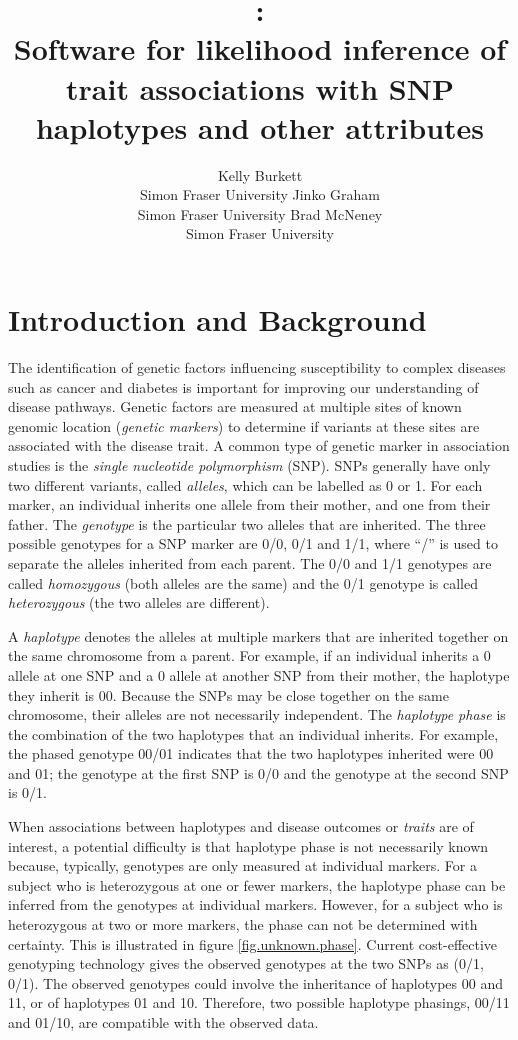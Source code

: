 \documentclass[article, shortnames]{jss}
\author{Kelly Burkett\\Simon Fraser University \And
        Jinko Graham\\Simon Fraser University \And 
	Brad McNeney\\Simon Fraser University  
	}
\title{\pkg{hapassoc}:\\ Software for likelihood inference of trait associations with SNP haplotypes and other attributes}
\begin{document}
\section{Introduction and Background}


The identification of genetic factors influencing susceptibility to
complex diseases such as cancer and diabetes is important for improving
our understanding of disease pathways. Genetic factors are measured at
multiple sites of known genomic location (\emph{genetic markers}) 
to determine if variants at these sites
are associated with the disease trait.
A common type of genetic marker in association studies is the
\emph{single nucleotide polymorphism} (SNP). SNPs
generally have only two different variants, called
\emph{alleles}, which can be labelled as 0 or 1. For each marker, an
individual inherits one allele from their mother, and one from their
father. The \emph{genotype} is the particular two alleles that are
inherited. The three possible genotypes for a SNP marker are 0/0, 0/1 and 1/1, 
where ``/'' is used to separate the alleles inherited from each parent. 
The 0/0 and 1/1 genotypes are called \emph{homozygous} (both alleles are the same)
and the 0/1 genotype is called \emph{heterozygous} (the two alleles are different).

A \emph{haplotype} denotes the alleles at multiple
markers that are inherited together on the same chromosome from a parent.  
For example, if an individual inherits a 0 allele at 
one SNP and a 0 allele at another SNP  
from their mother, the haplotype they inherit is 00.  
Because the SNPs may be close together on the same 
chromosome, their alleles are not necessarily independent.
The \emph{haplotype phase} is the combination of the two 
haplotypes that an individual inherits. For example, 
the phased genotype 00/01 indicates 
that the two haplotypes inherited were 00 and 01; the genotype at 
the first SNP is 0/0 and the genotype at the second SNP is 0/1.  

When associations between haplotypes and disease outcomes or \emph{traits} are
of interest, a potential difficulty is that haplotype phase is not 
necessarily known because, typically, genotypes are only measured at 
individual markers. For a subject who is heterozygous at one or fewer
markers, the haplotype phase can be inferred from the 
genotypes at individual markers. However, for a subject who is heterozygous at 
two or more markers, the phase can not be determined with certainty. 
This is illustrated in figure \ref{fig.unknown.phase}. 
Current cost-effective genotyping technology gives the observed genotypes 
at the two SNPs as (0/1, 0/1). The observed genotypes could involve the 
inheritance of haplotypes 00 and 11, or of haplotypes 01 and 10.
Therefore, two possible haplotype phasings,
00/11 and 01/10, are compatible with the observed data.
\end{document}
